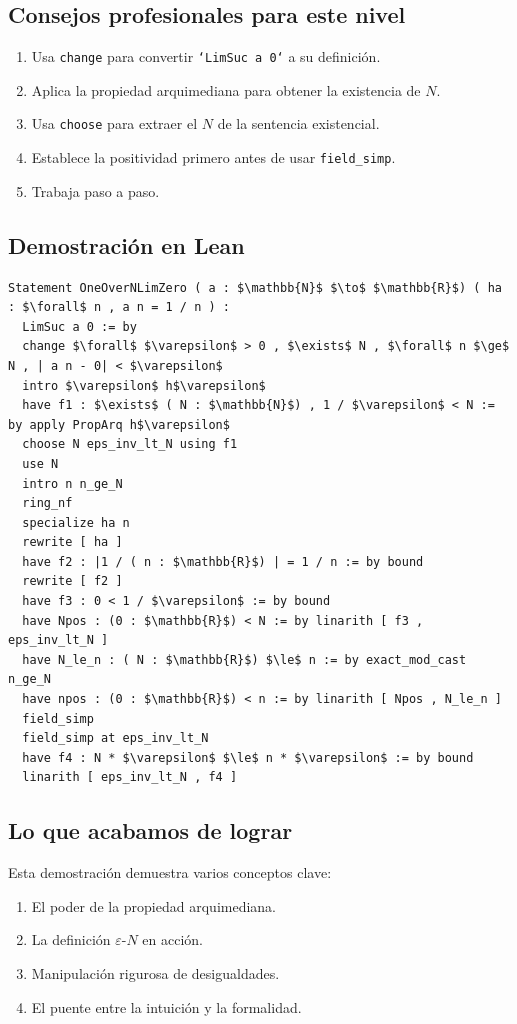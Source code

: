 \subsection{Consejos profesionales para este nivel}
\begin{enumerate}
    \item Usa \texttt{change} para convertir \texttt{`LimSuc a 0`} a su definición.
    \item Aplica la propiedad arquimediana para obtener la existencia de $N$.
    \item Usa \texttt{choose} para extraer el $N$ de la sentencia existencial.
    \item Establece la positividad primero antes de usar \texttt{field\_simp}.
    \item Trabaja paso a paso.
\end{enumerate}

\subsection{Demostración en Lean}

\begin{verbatim}
Statement OneOverNLimZero ( a : $\mathbb{N}$ $\to$ $\mathbb{R}$) ( ha : $\forall$ n , a n = 1 / n ) :
  LimSuc a 0 := by
  change $\forall$ $\varepsilon$ > 0 , $\exists$ N , $\forall$ n $\ge$ N , | a n - 0| < $\varepsilon$
  intro $\varepsilon$ h$\varepsilon$
  have f1 : $\exists$ ( N : $\mathbb{N}$) , 1 / $\varepsilon$ < N := by apply PropArq h$\varepsilon$
  choose N eps_inv_lt_N using f1
  use N
  intro n n_ge_N
  ring_nf
  specialize ha n
  rewrite [ ha ]
  have f2 : |1 / ( n : $\mathbb{R}$) | = 1 / n := by bound
  rewrite [ f2 ]
  have f3 : 0 < 1 / $\varepsilon$ := by bound
  have Npos : (0 : $\mathbb{R}$) < N := by linarith [ f3 , eps_inv_lt_N ]
  have N_le_n : ( N : $\mathbb{R}$) $\le$ n := by exact_mod_cast n_ge_N
  have npos : (0 : $\mathbb{R}$) < n := by linarith [ Npos , N_le_n ]
  field_simp
  field_simp at eps_inv_lt_N
  have f4 : N * $\varepsilon$ $\le$ n * $\varepsilon$ := by bound
  linarith [ eps_inv_lt_N , f4 ]
\end{verbatim}

\subsection{Lo que acabamos de lograr}
Esta demostración demuestra varios conceptos clave:
\begin{enumerate}
    \item El poder de la propiedad arquimediana.
    \item La definición $\varepsilon$-$N$ en acción.
    \item Manipulación rigurosa de desigualdades.
    \item El puente entre la intuición y la formalidad.
\end{enumerate}

